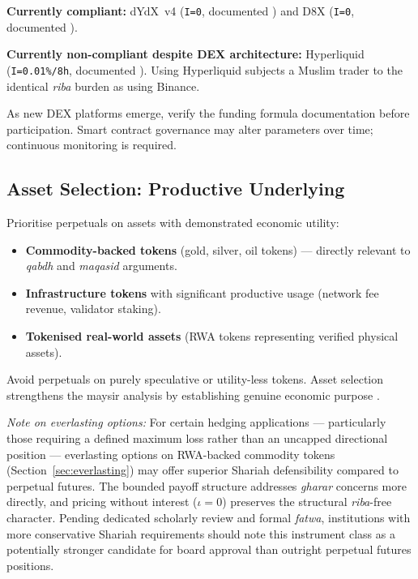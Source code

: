 \documentclass[10pt,twocolumn]{article}
\begin{document}
\textbf{Currently compliant:} dYdX~v4 (\texttt{I=0}, documented \cite{dYdX2024})
and D8X (\texttt{I=0}, documented \cite{D8X2024}).

\textbf{Currently non-compliant despite DEX architecture:} Hyperliquid
(\texttt{I=0.01\%/8h}, documented \cite{Hyperliquid2025}). Using Hyperliquid
subjects a Muslim trader to the identical \textit{riba} burden as using Binance.

As new DEX platforms emerge, verify the funding formula documentation before
participation. Smart contract governance may alter parameters over time;
continuous monitoring is required.

\subsection{Asset Selection: Productive Underlying}

Prioritise perpetuals on assets with demonstrated economic utility:
\begin{itemize}[noitemsep, leftmargin=*]
\item \textbf{Commodity-backed tokens} (gold, silver, oil tokens) --- directly
relevant to \textit{qabdh} and \textit{maqasid} arguments.
\item \textbf{Infrastructure tokens} with significant productive usage (network
fee revenue, validator staking).
\item \textbf{Tokenised real-world assets} (RWA tokens representing verified
physical assets).
\end{itemize}
Avoid perpetuals on purely speculative or utility-less tokens. Asset selection
strengthens the maysir analysis by establishing genuine economic purpose
\cite{Kalimullina2020}.

\noindent\textit{Note on everlasting options:} For certain hedging applications
--- particularly those requiring a defined maximum loss rather than an uncapped
directional position --- everlasting options on RWA-backed commodity tokens
(Section~\ref{sec:everlasting}) may offer superior Shariah defensibility compared
to perpetual futures. The bounded payoff structure addresses \textit{gharar}
concerns more directly, and pricing without interest ($\iota = 0$) preserves
the structural \textit{riba}-free character. Pending dedicated scholarly review
and formal \textit{fatwa}, institutions with more conservative Shariah
requirements should note this instrument class as a potentially stronger
candidate for board approval than outright perpetual futures positions.
\end{document}
